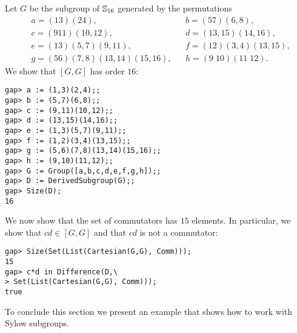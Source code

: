 \begin{example}
\label{ex:commutatorElementsS16}
Let $G$ be the
subgroup of $\mathbb{S}_{16}$ generated by the permutations
\begin{align*}
&a = (13)(24),&&
b = (57)(6,8),\\
&c = (911)(10,12),&&
d = (13,15)(14,16),\\
&e = (13)(5,7)(9,11),&&
f = (12)(3,4)(13,15),\\
&g = (56)(7,8)(13,14)(15,16),&&
h = (9\;10)(11\;12).
\end{align*}
We show that $[G,G]$ has order $16$: 
\begin{lstlisting}
gap> a := (1,3)(2,4);;
gap> b := (5,7)(6,8);;
gap> c := (9,11)(10,12);;
gap> d := (13,15)(14,16);;
gap> e := (1,3)(5,7)(9,11);;
gap> f := (1,2)(3,4)(13,15);;
gap> g := (5,6)(7,8)(13,14)(15,16);;
gap> h := (9,10)(11,12);;
gap> G := Group([a,b,c,d,e,f,g,h]);;
gap> D := DerivedSubgroup(G);;
gap> Size(D);
16
\end{lstlisting}
We now show that the set of commutators 
has $15$ elements. In particular, we show that 
$cd\in[G,G]$ and that $cd$ is not a commutator: 
\begin{lstlisting}
gap> Size(Set(List(Cartesian(G,G), Comm)));
15
gap> c*d in Difference(D,\
> Set(List(Cartesian(G,G), Comm)));
true
\end{lstlisting}
\end{example}


To conclude this section we present an example
that shows how to work with Sylow subgroups. 

